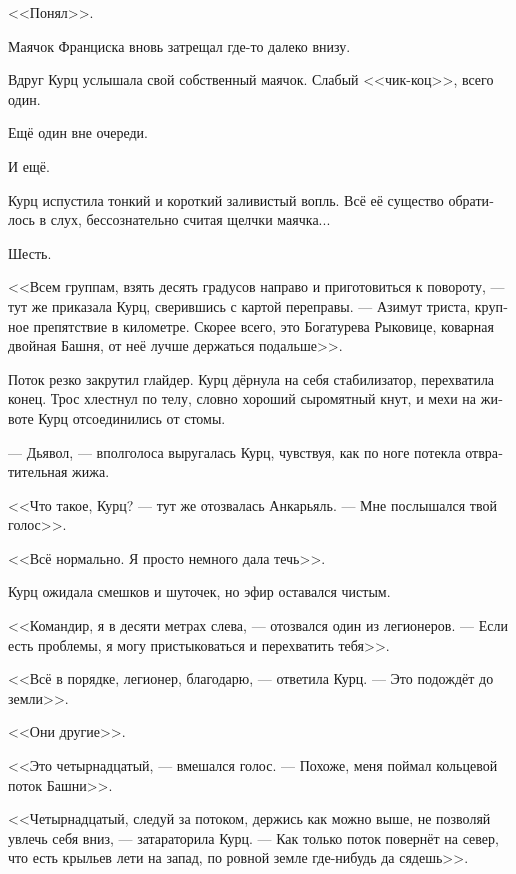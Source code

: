 \documentclass[a4paper,10pt,fleqn]{book}\usepackage{polyglossia}\setdefaultlanguage[babelshorthands=true]{russian}\setotherlanguage{english}\defaultfontfeatures{Ligatures=TeX,Mapping=tex-text}\usepackage{xcolor}\newcommand{\ml}[3]{#2}
\newcommand{\asterism}{\vspace{1em}{\centering\Large\bfseries$\ast~\ast~\ast$\par}\vspace{1em}}
\begin{document}
\ml{$0$}
{<<Понял>>.}
{``Roger that.''}

Маячок Франциска вновь затрещал где-то далеко внизу.

\asterism

Вдруг Курц услышала свой собственный маячок.
Слабый <<чик-коц>>, всего один.

Ещё один вне очереди.

И ещё.

Курц испустила тонкий и короткий заливистый вопль.
Всё её существо обратилось в слух, бессознательно считая щелчки маячка...

Шесть.

<<Всем группам, взять десять градусов направо и приготовиться к повороту, --- тут же приказала Курц, сверившись с картой переправы.
--- Азимут триста, крупное препятствие в километре.
\ml{$0$}
{Скорее всего, это Богатурева Рыковице, коварная двойная Башня, от неё лучше держаться подальше>>.}
{Most likely, it's Bogaturewa Rykovitze, a treacherous double Tower, better to keep a fair distance.''}

Поток резко закрутил глайдер.
Курц дёрнула на себя стабилизатор, перехватила конец.
Трос хлестнул по телу, словно хороший сыромятный кнут, и мехи на животе Курц отсоединились от стомы.

--- Дьявол, --- вполголоса выругалась Курц, чувствуя, как по ноге потекла отвратительная жижа.

\ml{$0$}
{<<Что такое, Курц? --- тут же отозвалась Анкарьяль.}
{``Whazzup, Kurz?'' Angaralle immediately answered.}
\ml{$0$}
{--- Мне послышался твой голос>>.}
{``I thought I heard your voice.''}

\ml{$0$}
{<<Всё нормально.}
{``I'm all right.}
\ml{$0$}
{Я просто немного дала течь>>.}
{Just sprung a leak.''}

Курц ожидала смешков и шуточек, но эфир оставался чистым.

<<Командир, я в десяти метрах слева, --- отозвался один из легионеров.
--- Если есть проблемы, я могу пристыковаться и перехватить тебя>>.

<<Всё в порядке, легионер, благодарю, --- ответила Курц.
--- Это подождёт до земли>>.

\ml{$0$}
{<<Они другие>>.}
{They're different.}

<<Это четырнадцатый, --- вмешался голос.
--- Похоже, меня поймал кольцевой поток Башни>>.

<<Четырнадцатый, следуй за потоком, держись как можно выше, не позволяй увлечь себя вниз, --- затараторила Курц.
--- Как только поток повернёт на север, что есть крыльев лети на запад, по ровной земле где-нибудь да сядешь>>.
\end{document}
